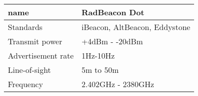 \begin{tabular}{|l|l|}
\hline
name	             & RadBeacon Dot                 \\ \hline
Standards          & iBeacon, AltBeacon, Eddystone \\ \hline
Transmit power     & +4dBm - -20dBm                \\ \hline
Advertisement rate & 1Hz-10Hz                      \\ \hline
Line-of-sight			 & 5m to 50m										 \\ \hline
Frequency	 				 & 2.402GHz - 2380GHz						 \\ \hline
\end{tabular}

